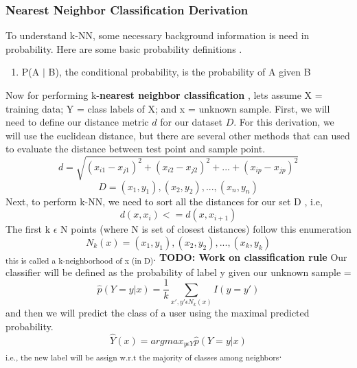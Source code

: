 \documentclass{report}
\begin{document}
\subsubsection{Nearest Neighbor Classification Derivation}
To understand k-NN, some necessary background information is need in probability. Here are some basic probability definitions . \cite{4}
\begin{enumerate}
	\item P(A $|$ B), the conditional probability, is the probability of A given B
\end{enumerate}
Now for performing k-\textbf{nearest neighbor classification },  lets assume X = training data; Y = class labels of X; and x = unknown sample.
\newline \newline
First, we will need to define our distance metric $d$ for our dataset $D$. For this derivation, we will use the euclidean distance, but there are several other methods that can used to evaluate the distance between test point and sample point.
\begin{equation}
d= \sqrt{(x_{i1} - x_{j1})^2 + (x_{i2} - x_{j2})^2 + ... + (x_{ip} - x_{jp})^2}
\end{equation}
\begin{equation}
D = (x_{1}, y_{1}), (x_{2}, y_{2}), ... , (x_{n}, y_{n})
\end{equation}
Next, to perform k-NN, we need to sort all the distances for our set D , i.e,
\begin{equation}
d(x,x_{i}) <= d(x,x_{i+1})
\end{equation}
The first k $\epsilon$ N points (where N is set of closest distances) follow this  enumeration 
\begin{equation}
N_{k}(x) = (x_{1}, y_{1}), (x_{2}, y_{2}), ... , (x_{k}, y_{k}) 
\end{equation} 
\textsubscript{this is called a k-neighborhood of x (in D)}. \newline\newline
\textbf{TODO: Work on classification rule}
Our classifier will be defined as the probability of label y given our unknown sample = 
\begin{equation}
\hat{p}(Y = y | x) = \frac{1}{k} \sum_{x',y' \epsilon N_{k}(x) }  I(y = y')
\end{equation}
and then we will predict the class of a user using the maximal predicted probability.
\begin{equation}
\hat{Y}(x) = argmax_{y \epsilon Y} \hat{p}(Y = y |x)
\end{equation}
\textsubscript{i.e., the  new label will be assign w.r.t the majority of classes among neighbors}. \newline\newline
\end{document}
